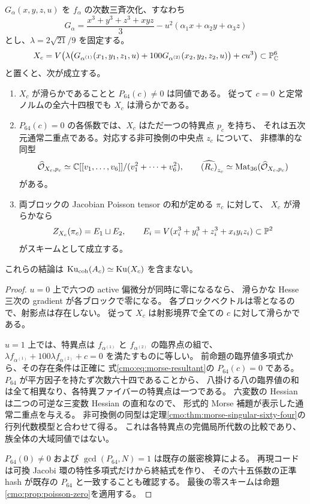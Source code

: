 \begin{theorem}[判別集合と局所節点が一致する可換候補]
\label{cmo:thm:commutative-discriminant-candidate}
$G_\alpha(x,y,z,u)$ を $f_\alpha$ の次数三斉次化、すなわち
\[
 G_\alpha=\frac{x^3+y^3+z^3+xyz}{3}
              -u^2(\alpha_1x+\alpha_2y+\alpha_3z)
\]
とし、$\lambda=2\sqrt{21}/9$ を固定する。
\begin{equation}\label{cmo:eq:commutative-candidate}
 X_c=V\!\left(\lambda\bigl(G_{\alpha^{(1)}}(x_1,y_1,z_1,u)
            +100G_{\alpha^{(2)}}(x_2,y_2,z_2,u)\bigr)+cu^3\right)
       \subset\mathbb P^6_\mathbb C
\end{equation}
と置くと、次が成立する。
\begin{enumerate}
\item $X_c$ が滑らかであることと $P_{64}(c)\ne0$ は同値である。
      従って $c=0$ と定常ノルムの全六十四根でも $X_c$ は滑らかである。
\item $P_{64}(c)=0$ の各係数では、$X_c$ はただ一つの特異点 $p_c$ を持ち、
      それは五次元通常二重点である。対応する非可換側の中央点 $z_c$ について、
      非標準的な同型
      \[
       \widehat{\mathcal O}_{X_c,p_c}
          \simeq\mathbb C[[v_1,\ldots,v_6]]/(v_1^2+\cdots+v_6^2),\qquad
       \widehat{(R_c)}_{z_c}
          \simeq\operatorname{Mat}_{36}(\widehat{\mathcal O}_{X_c,p_c})
      \]
      がある。
\item 両ブロックの Jacobian Poisson tensor の和が定める $\pi_c$ に対して、
      $X_c$ が滑らかなら
      \[
       Z_{X_c}(\pi_c)=E_1\sqcup E_2,\qquad
       E_i=V(x_i^3+y_i^3+z_i^3+x_iy_iz_i)\subset\mathbb P^2
      \]
      がスキームとして成立する。
\end{enumerate}
これらの結論は $\operatorname{Ku}_{\mathrm{coh}}(A_c)\simeq\operatorname{Ku}(X_c)$ を含まない。
\end{theorem}
\begin{proof}
$u=0$ 上で六つの active 偏微分が同時に零になるなら、
滑らかな Hesse 三次の gradient が各ブロックで零になる。
各ブロックベクトルは零となるので、射影点は存在しない。
従って $X_c$ は射影境界で全ての $c$ に対して滑らかである。

$u=1$ 上では、特異点は $f_{\alpha^{(1)}}$ と
$f_{\alpha^{(2)}}$ の臨界点の組で、
$\lambda f_{\alpha^{(1)}}+100\lambda f_{\alpha^{(2)}}+c=0$
を満たすものに等しい。
前命題の臨界値多項式から、その存在条件は正確に
式\eqref{cmo:eq:morse-resultant}の $P_{64}(c)=0$ である。
$P_{64}$ が平方因子を持たず次数六十四であることから、
八掛ける八の臨界値の和は全て相異なり、各特異ファイバーの特異点は一つである。
六変数の Hessian は二つの可逆な三変数 Hessian の直和なので、
形式的 Morse 補題が表示した通常二重点を与える。
非可換側の同型は定理\ref{cmo:thm:morse-singular-sixty-four}の
行列代数模型と合わせて得る。
これは各特異点の完備局所代数の比較であり、族全体の大域同値ではない。

$P_{64}(0)\ne0$ および $\gcd(P_{64},N)=1$ は既存の厳密検算による。
再現コードは可換 Jacobi 環の特性多項式だけから終結式を作り、
その六十五係数の正準 hash が既存の $P_{64}$ と一致することも確認する。
最後の零スキームは命題\ref{cmo:prop:poisson-zero}を適用する。
\end{proof}

